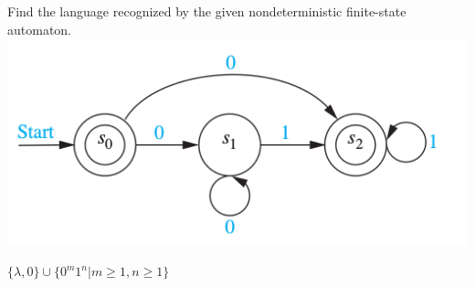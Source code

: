 \documentclass[../main.tex]{subfiles}
\begin{document}
Find the language recognized by the given nondeterministic finite-state automaton. \\
\includegraphics[width=\textwidth]{img/Q13_3_45}

\solution
$\{\lambda, 0\} \cup \{0^m1^n | m \geq 1, n \geq 1\}$
\end{document}
